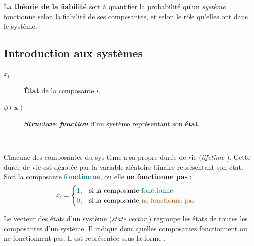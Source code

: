 \documentclass[10pt, french]{article}
\begin{document}
\begin{multicols*}{2}
\begin{definitionNOHFILL}
La \textbf{théorie de la fiabilité} sert à quantifier la probabilité qu'un \textit{système} fonctionne selon la fiabilité de ses composantes, et selon le rôle qu'elles ont dans le système.
\end{definitionNOHFILL}


\subsection{Introduction aux systèmes}
\begin{distributions}[Notation]
\begin{description}
	\item[$x_{i}$]	\textbf{État} de la composante $i$.
	\item[$\phi(\bm{x})$]	\og \textit{\textbf{Structure function}} \fg{} d'un système représentant son \textbf{état}.
\end{description}
\end{distributions}

\

\begin{definitionNOHFILLsub}
Chacune des composantes du sys tème a sa propre durée de vie (\og \textit{lifetime} \fg{}). Cette durée de vie est dénotée par la variable aléatoire binaire  représentant son état.\\

Soit la composante \textbf{\textcolor{teal}{fonctionne}}, ou elle \textbf{\textcolor{burntorange}{ne fonctionne pas}} :
\begin{align*}
	x_{i}
	&=	\begin{cases}
		\textcolor{teal}{1},	&	\text{si la composante \textcolor{teal}{fonctionne}}	\\
		\textcolor{burntorange}{0},	&	\text{si la composante \textcolor{burntorange}{ne fonctionne pas}}	
		\end{cases}
\end{align*}
\end{definitionNOHFILLsub}

\begin{definitionNOHFILLsub}
Le vecteur des états d'un système (\og \textit{state vector} \fg{}) regroupe les états de toutes les composantes d'un système. Il indique donc quelles composantes fonctionnent ou ne fonctionnent pas. Il est représentée sous la forme .\\


\end{definitionNOHFILLsub}
\end{multicols*}
\end{document}
